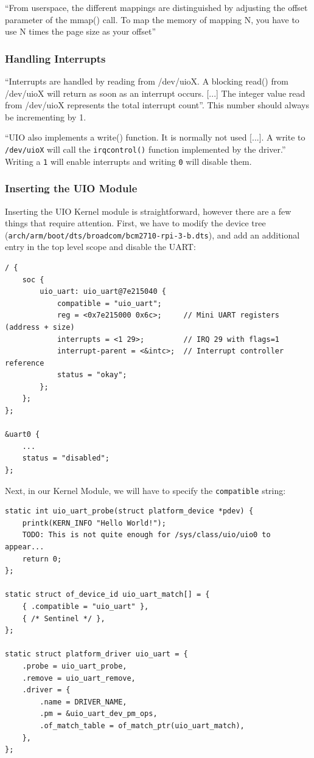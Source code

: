 \documentclass[../main.tex]{subfiles}
\begin{document}
    \enquote{From userspace, the different mappings are distinguished by adjusting the offset parameter of the mmap() call. To map the memory of mapping N, you have to use N times the page size as your offset}

    \subsubsection{Handling Interrupts}
    \enquote{Interrupts are handled by reading from /dev/uioX. A blocking read() from /dev/uioX will return as soon as an interrupt occurs. [...] The integer value read from /dev/uioX represents the total interrupt count}. This number should always be incrementing by 1.

    \enquote{UIO also implements a write() function. It is normally not used [...]. A write to \texttt{/dev/uioX} will call the \texttt{irqcontrol()} function implemented by the driver.} Writing a \texttt{1} will enable interrupts and writing \texttt{0} will disable them.

    \subsubsection{Inserting the UIO Module}
    Inserting the UIO Kernel module is straightforward, however there are a few things that require attention. First, we have to modify the device tree (\texttt{arch/arm/boot/dts/broadcom/bcm2710-rpi-3-b.dts}), and add an additional entry in the top level scope and disable the UART:
    \begin{verbatim}
/ {
    soc {
        uio_uart: uio_uart@7e215040 {
            compatible = "uio_uart";
            reg = <0x7e215000 0x6c>;     // Mini UART registers (address + size)
            interrupts = <1 29>;         // IRQ 29 with flags=1
            interrupt-parent = <&intc>;  // Interrupt controller reference
            status = "okay";
        };
    };
};

&uart0 {
    ...
    status = "disabled";
};
    \end{verbatim}

    \newpage
    Next, in our Kernel Module, we will have to specify the \texttt{compatible} string:

    \begin{verbatim}
static int uio_uart_probe(struct platform_device *pdev) {
    printk(KERN_INFO "Hello World!");
    TODO: This is not quite enough for /sys/class/uio/uio0 to appear...
    return 0;
};

static struct of_device_id uio_uart_match[] = {
    { .compatible = "uio_uart" },
    { /* Sentinel */ },
};

static struct platform_driver uio_uart = {
    .probe = uio_uart_probe,
    .remove = uio_uart_remove,
    .driver = {
        .name = DRIVER_NAME,
        .pm = &uio_uart_dev_pm_ops,
        .of_match_table = of_match_ptr(uio_uart_match),
    },
};
    \end{verbatim}
\end{document}
